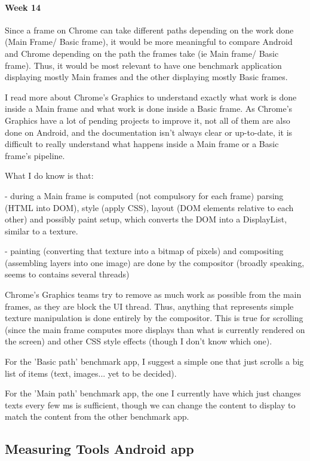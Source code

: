 \documentclass{kththesis}
\begin{document}
\paragraph{Week 14}
Since a frame on Chrome can take different paths depending on the work done (Main Frame/ Basic frame), it would be more meaningful to compare Android and Chrome depending on the path the frames take (ie Main frame/ Basic frame). Thus, it would be most relevant to have one benchmark application displaying mostly Main frames and the other displaying mostly Basic frames.

I read more about Chrome's Graphics to understand exactly what work is done inside a  Main frame and what work is done inside a Basic frame. As Chrome's Graphics have a lot of pending projects to improve it, not all of them are also done on Android, and the documentation isn't always clear or up-to-date, it is difficult to really understand what happens inside a Main frame or a Basic frame's pipeline.

What I do know is that:

    - during a Main frame is computed (not compulsory for each frame) parsing (HTML into DOM), style (apply CSS), layout (DOM elements relative to each other) and possibly paint setup, which converts the DOM into a DisplayList, similar to a texture.

    - painting (converting that texture into a bitmap of pixels) and compositing (assembling layers into one image) are done by the compositor (broadly speaking, seems to contains several threads)

Chrome's Graphics teams try to remove as much work as possible from the main frames, as they are block the UI thread. Thus, anything that represents simple texture manipulation is done entirely by the compositor. This is true for scrolling (since the main frame computes more displays than what is currently rendered on the screen) and other CSS style effects (though I don't know which one).

For the 'Basic path' benchmark app, I suggest a simple one that just scrolls a big list of items (text, images... yet to be decided).

For the 'Main path' benchmark app, the one I currently have which just changes texts every few ms is sufficient, though we can change the content to display to match the content from the other benchmark app.




\subsection{Measuring Tools Android app}
\end{document}
